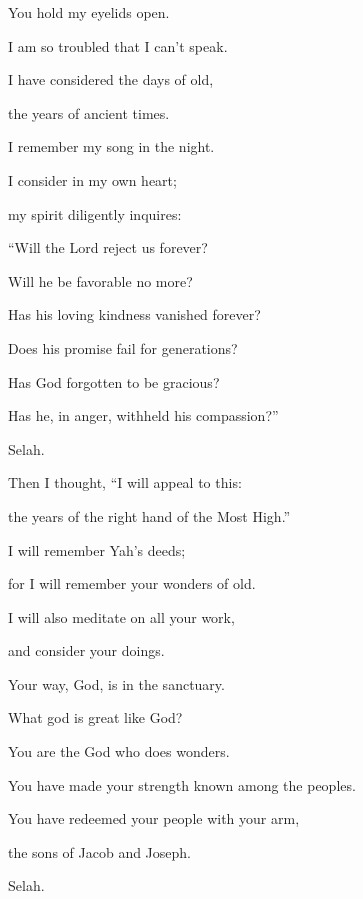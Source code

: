 {\BB \par }{\Q {}You hold my eyelids open.
\par }{\QB I am so troubled that I can’t speak.
\par }{\Q {}I have considered the days of old,
\par }{\QB the years of ancient times.
\par }{\Q {}I remember my song in the night.
\par }{\QB I consider in my own heart;
\par }{\QB my spirit diligently inquires:
\par }{\Q {}“Will the Lord reject us forever?
\par }{\QB Will he be favorable no more?
\par }{\Q {}Has his loving kindness vanished forever?
\par }{\QB Does his promise fail for generations?
\par }{\Q {}Has God forgotten to be gracious?
\par }{\QB Has he, in anger, withheld his compassion?”
\par }{\QS Selah.\par }
{\Q {}Then I thought, “I will appeal to this:
\par }{\QB the years of the right hand of the Most High.”
\par }{\Q {}I will remember Yah’s deeds;
\par }{\QB for I will remember your wonders of old.
\par }{\Q {}I will also meditate on all your work,
\par }{\QB and consider your doings.
\par }{\Q {}Your way, God, is in the sanctuary.
\par }{\QB What god is great like God?
\par }{\Q {}You are the God who does wonders.
\par }{\QB You have made your strength known among the peoples.
\par }{\Q {}You have redeemed your people with your arm,
\par }{\QB the sons of Jacob and Joseph.
\par }{\QS Selah.\par }
